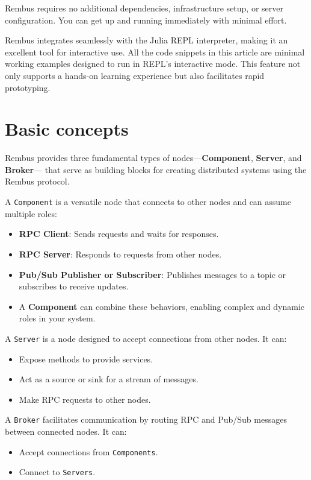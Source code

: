 \documentclass{juliacon}
\begin{document}
Rembus requires no additional dependencies, infrastructure setup, or
server configuration. You can get up and running immediately with
minimal effort.
\vskip 6pt

Rembus integrates seamlessly with the Julia REPL interpreter, making it
an excellent tool for interactive use. All the code snippets in this
article are minimal working examples designed to run in REPL's
interactive mode. This feature not only supports a hands-on learning
experience but also facilitates rapid prototyping.

\section{Basic concepts}\label{basic-concepts}

Rembus provides three fundamental types of nodes---\textbf{Component},
\textbf{Server}, and \textbf{Broker}--- that serve as building blocks
for creating distributed systems using the Rembus protocol.
\vskip 6pt

A \texttt{Component} is a versatile node that connects to other nodes
and can assume multiple roles:

\begin{itemize}
\item
  \textbf{RPC Client}: Sends requests and waits for responses.
\item
  \textbf{RPC Server}: Responds to requests from other nodes.
\item
  \textbf{Pub/Sub Publisher or Subscriber}: Publishes messages to a
  topic or subscribes to receive updates.
\item
  A \textbf{Component} can combine these behaviors, enabling complex and
  dynamic roles in your system.
\end{itemize}

A \texttt{Server} is a node designed to accept connections from other nodes. It can:

\begin{itemize}
\item
  Expose methods to provide services.
\item
  Act as a source or sink for a stream of messages.
\item
  Make RPC requests to other nodes.
\end{itemize}

A \texttt{Broker} facilitates communication by routing RPC and Pub/Sub
messages between connected nodes. It can:

\begin{itemize}
\item
  Accept connections from \texttt{Components}.
\item
  Connect to \texttt{Servers}.
\end{itemize}
\end{document}
